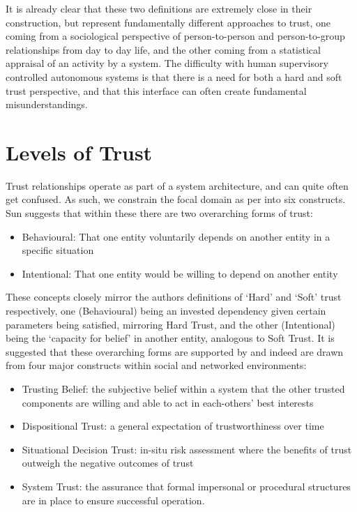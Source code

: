 It is already clear that these two definitions are extremely close in their construction, but represent fundamentally different approaches to trust, one coming from a sociological perspective of person-to-person and person-to-group relationships from day to day life, and the other coming from a statistical appraisal of an activity by a system.
The difficulty with human supervisory controlled autonomous systems is that there is a need for both a hard and soft trust perspective, and that this interface can often create fundamental misunderstandings.


\section{Levels of Trust}
Trust relationships operate as part of a system architecture, and can quite often get confused.
As such, we constrain the focal domain as per \cite{Liu2006} into six constructs.
Sun\cite{Sun2008} suggests that within these there are two overarching forms of trust:
\begin{itemize}
	\item Behavioural: That one entity voluntarily depends on another entity in a specific situation
	\item Intentional: That one entity would be willing to depend on another entity
\end{itemize}

These concepts closely mirror the authors definitions of ‘Hard’ and ‘Soft’ trust respectively, one (Behavioural) being an invested dependency given certain parameters being satisfied, mirroring Hard Trust, and the other (Intentional) being the ‘capacity for belief’ in another entity, analogous to Soft Trust.
It is suggested that these overarching forms are supported by and indeed are drawn from four major constructs within social and networked environments:
\begin{itemize}
	\item Trusting Belief: the subjective belief within a system that the other trusted components are willing and able to act in each-others’ best interests
	\item Dispositional Trust: a general expectation of trustworthiness over time 
	\item Situational Decision Trust: in-situ risk assessment where the benefits of trust outweigh the negative outcomes of trust
	\item System Trust: the assurance that formal impersonal or procedural structures are in place to ensure successful operation.
\end{itemize}

